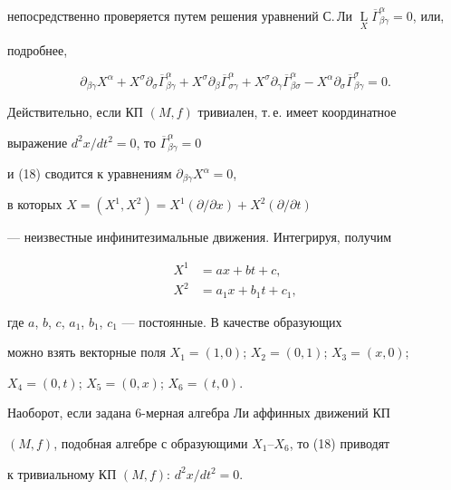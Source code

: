 непосредственно проверяется путем решения уравнений С.\,Ли $\mathop{


L}\limits_{X}\overline{\Gamma}^{\alpha}_{\beta \gamma} =0$, или,


подробнее,


\begin{equation}


\partial_{\beta\gamma}X^{\alpha}


+ X^{\sigma}\partial_{\sigma }\overline{\Gamma}^{\alpha}_{\beta \gamma}


+ X^{\sigma}\partial_{\beta }\overline{\Gamma}^{\alpha}_{\sigma \gamma}


+ X^{\sigma}\partial_{\gamma }\overline{\Gamma}^{\alpha}_{\beta \sigma}


- X^{\alpha}\partial_{\sigma }\overline{\Gamma}^{\sigma}_{\beta \gamma}=0.


\end{equation}





Действительно, если КП $(M,f) $ тривиален, т.\,е. имеет координатное


выражение $d^2x/dt^2=0$, то $\overline{\Gamma}^{\alpha}_{\beta \gamma} =0$


и (18) сводится  к уравнениям $\partial_{\beta \gamma}X^{\alpha}=0$,


в которых $X=(X^1,X^2)=X^1 (\partial/\partial x)+X^2( \partial/\partial t)$


--- неизвестные инфинитезимальные движения. Интегрируя, получим


\begin{align*}


X^1&=ax+bt+c,\\


X^2&=a_1x+b_1t+c_1,


\end{align*}


где $a$, $b$, $c$, $a_1$, $b_1$, $c_1$ --- постоянные. В качестве образующих


можно взять векторные поля $X_1=(1,0)$; $ X_2=(0,1)$; $X_3=(x,0)$;


$ X_4=(0,t)$; $ X_5=(0,x)$; $ X_6=(t,0)$.


Наоборот, если задана 6-мерная алгебра Ли аффинных движений КП


$(M,f) $, подобная алгебре с образующими $X_1$--$X_6$, то (18) приводят


к тривиальному КП $(M,f) $: $d^2x/dt^2=0$.





